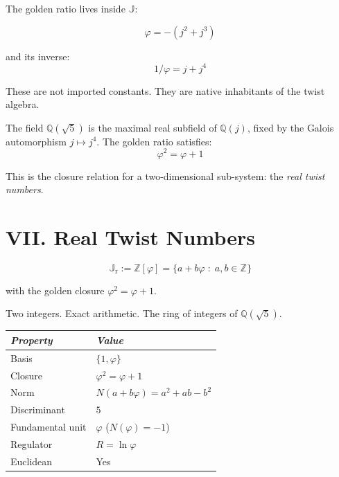 \documentclass[11pt, a4paper]{article}
\newcommand{\ph}{\varphi}
\newcommand{\TT}{\mathbb{J}}
\newcommand{\TTr}{\mathbb{J}_{\mathrm{r}}}
\begin{document}
The golden ratio lives inside $\TT$:

\begin{equation*}
\boxed{\ph = -(j^2 + j^3)}
\end{equation*}

and its inverse:
\begin{equation*}
1/\ph = j + j^4
\end{equation*}

These are not imported constants. They are native inhabitants of the twist algebra.

The field $\mathbb{Q}(\sqrt{5})$ is the maximal real subfield of $\mathbb{Q}(j)$, fixed by the Galois automorphism $j \mapsto j^4$. The golden ratio satisfies:
\begin{equation*}
\ph^2 = \ph + 1
\end{equation*}

This is the closure relation for a two-dimensional sub-system: the \textit{real twist numbers}.

\section*{VII. Real Twist Numbers}

\begin{equation*}
\TTr := \mathbb{Z}[\ph] = \{a + b\ph \;:\; a, b \in \mathbb{Z}\}
\end{equation*}

with the golden closure $\ph^2 = \ph + 1$.

Two integers. Exact arithmetic. The ring of integers of $\mathbb{Q}(\sqrt{5})$.

\renewcommand{\arraystretch}{1.4}
\begin{tabularx}{\textwidth}{LL}
\toprule
\textit{Property} & \textit{Value} \\
\midrule
Basis & $\{1, \ph\}$ \\[0.2em]
Closure & $\ph^2 = \ph + 1$ \\[0.2em]
Norm & $N(a + b\ph) = a^2 + ab - b^2$ \\[0.2em]
Discriminant & $5$ \\[0.2em]
Fundamental unit & $\ph$ \;($N(\ph) = -1$) \\[0.2em]
Regulator & $R = \ln\ph$ \\[0.2em]
Euclidean & Yes \\
\bottomrule
\end{tabularx}
\end{document}
